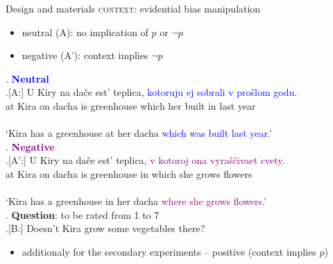 \documentclass[xcolor=dvipsnames]{beamer}
\begin{document}
\begin{frame}{Design and materials}
    \textsc{context}: evidential bias manipulation 
    \begin{itemize}
        \item neutral (A): no implication of $p$ or $\neg p$
        \item negative (A'): context implies $\neg p$ 
    \end{itemize}
    \begin{footnotesize}
    \ex. \textcolor{blue}{\textbf{Neutral}} \\
        \ag.[A:] U Kiry na dače est' teplica, \textcolor{blue}{kotoruju} \textcolor{blue}{ej} 
        \textcolor{blue}{sobrali} \textcolor{blue}{v} \textcolor{blue}{prošlom} \textcolor{blue}{godu.}  \\
        at Kira on dacha is greenhouse which her built in last year \\\\
        `Kira has a greenhouse at her dacha \textcolor{blue}{which was built last year.}' \\
        \z. \textcolor{purple}{\textbf{Negative}} \\
        \ag.[A':] U Kiry na dače est' teplica, \textcolor{purple}{v} \textcolor{purple}{kotoroj} 
        \textcolor{purple}{ona} \textcolor{purple}{vyraščivaet} \textcolor{purple}{cvety.}  \\
        at Kira on dacha is greenhouse in which she grows flowers \\\\
        `Kira has a greenhouse in her dacha \textcolor{purple}{where she grows flowers.}' \\
        \z. \textbf{Question}: to be rated from 1 to 7 \\
        \a.[B:] Doesn't Kira grow some vegetables there?
        \par 
    \end{footnotesize}
    \pause 
    \begin{small}
        \begin{itemize}
            \item additionaly for the secondary experiments -- positive (context implies $p$)
        \end{itemize}
    \end{small}
\end{frame}
\end{document}
